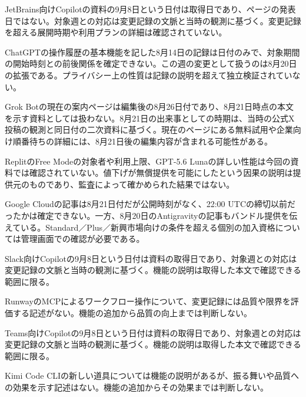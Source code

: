 \begin{claimboundary}
JetBrains向けCopilotの資料の9月8日という日付は取得日であり、ページの発表日ではない。対象週との対応は変更記録の文脈と当時の観測に基づく。変更記録を超える展開時期や利用プランの詳細は確認されていない。
\end{claimboundary}
\begin{claimboundary}
ChatGPTの操作履歴の基本機能を記した8月14日の記録は日付のみで、対象期間の開始時刻との前後関係を確定できない。この週の変更として扱うのは8月20日の拡張である。プライバシー上の性質は記録の説明を超えて独立検証されていない。
\end{claimboundary}
\begin{claimboundary}
Grok Botの現在の案内ページは編集後の8月26日付であり、8月21日時点の本文を示す資料としては扱わない。8月21日の出来事としての時期は、当時の公式X投稿の観測と同日付の二次資料に基づく。現在のページにある無料試用や企業向け順番待ちの詳細には、8月21日後の編集内容が含まれる可能性がある。
\end{claimboundary}
\begin{claimboundary}
ReplitのFree Modeの対象者や利用上限、GPT-5.6 Lunaの詳しい性能は今回の資料では確認されていない。値下げが無償提供を可能にしたという因果の説明は提供元のものであり、監査によって確かめられた結果ではない。
\end{claimboundary}
\begin{claimboundary}
Google Cloudの記事は8月21日付だが公開時刻がなく、22:00 UTCの締切以前だったかは確定できない。一方、8月20日のAntigravityの記事もバンドル提供を伝えている。Standard／Plus／新興市場向けの条件を超える個別の加入資格については管理画面での確認が必要である。
\end{claimboundary}
\begin{claimboundary}
Slack向けCopilotの9月8日という日付は資料の取得日であり、対象週との対応は変更記録の文脈と当時の観測に基づく。機能の説明は取得した本文で確認できる範囲に限る。
\end{claimboundary}
\begin{claimboundary}
RunwayのMCPによるワークフロー操作について、変更記録には品質や限界を評価する記述がない。機能の追加から品質の向上までは判断しない。
\end{claimboundary}
\begin{claimboundary}
Teams向けCopilotの9月8日という日付は資料の取得日であり、対象週との対応は変更記録の文脈と当時の観測に基づく。機能の説明は取得した本文で確認できる範囲に限る。
\end{claimboundary}
\begin{claimboundary}
Kimi Code CLIの新しい道具については機能の説明があるが、振る舞いや品質への効果を示す記述はない。機能の追加からその効果までは判断しない。
\end{claimboundary}
